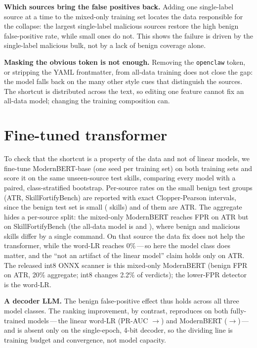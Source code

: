 \MechanismSentence{}

\textbf{Which sources bring the false positives back.} Adding one single-label source at a time to
the mixed-only training set locates the data responsible for the collapse: the largest single-label
malicious sources restore the high benign false-positive rate, while small ones do not. This shows
the failure is driven by the single-label malicious bulk, not by a lack of benign coverage alone.

\textbf{Masking the obvious token is not enough.} Removing the \texttt{openclaw} token, or stripping
the YAML frontmatter, from all-data training does not close the gap: the model falls back on the many
other style cues that distinguish the sources. The shortcut is distributed across the text, so
editing one feature cannot fix an all-data model; changing the training composition can.

\section{Fine-tuned transformer}
\label{sec:transformer}
To check that the shortcut is a property of the data and not of linear models, we fine-tune
ModernBERT-base (one seed per training set) on both training sets and score it on the same
unseen-source test skills, comparing every model with a paired, class-stratified bootstrap.
\TransformerSentence{} Per-source rates on the small benign test groups (ATR, SkillFortifyBench) are
reported with exact Clopper-Pearson intervals, since the benign test set is small (\TestBenign{} skills) and \TestAtrBenign{} of them are ATR. The aggregate hides a per-source split: the mixed-only ModernBERT
reaches \MbAtrMixed{} FPR on ATR but \MbSfbMixed{} on SkillFortifyBench (the all-data model is
\MbAtrAll{} and \MbSfbAll{}), where benign and malicious skills differ by a single command. On that
source the data fix does not help the transformer, while the word-LR reaches 0\%\,---\,so here the
model class does matter, and the ``not an artifact of the linear model'' claim holds only on ATR. The
released int8 ONNX scanner is this mixed-only ModernBERT (benign FPR \MbAtrMixed{} on ATR, 20\%
aggregate; int8 changes 2.2\% of verdicts); the lower-FPR detector is the word-LR.

\textbf{A decoder LLM.} \DecoderSentence{} The benign false-positive effect thus holds across all three
model classes. The ranking improvement, by contrast, reproduces on both fully-trained models\,---\,the
linear word-LR (PR-AUC \PrAll{}$\to$\PrMixed{}) and ModernBERT (\MbPrAll{}$\to$\MbPrMixed{})\,---\,and is
absent only on the single-epoch, 4-bit decoder, so the dividing line is training budget and convergence,
not model capacity.

